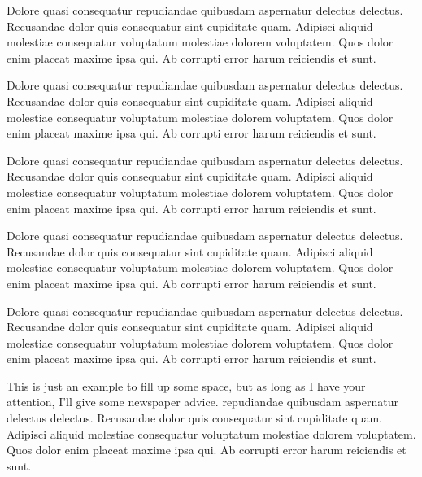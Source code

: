 \documentclass{article}
\date{\currenttime}
\begin{document}
\maketitle

\begin{multicols}{2}{


\Large

Dolore quasi consequatur repudiandae quibusdam aspernatur delectus delectus. Recusandae dolor quis consequatur sint cupiditate quam. Adipisci aliquid molestiae consequatur voluptatum molestiae dolorem voluptatem. Quos dolor enim placeat maxime ipsa qui. Ab corrupti error harum reiciendis et sunt.

Dolore quasi consequatur repudiandae quibusdam aspernatur delectus delectus. Recusandae dolor quis consequatur sint cupiditate quam. Adipisci aliquid molestiae consequatur voluptatum molestiae dolorem voluptatem. Quos dolor enim placeat maxime ipsa qui. Ab corrupti error harum reiciendis et sunt.

Dolore quasi consequatur repudiandae quibusdam aspernatur delectus delectus. Recusandae dolor quis consequatur sint cupiditate quam. Adipisci aliquid molestiae consequatur voluptatum molestiae dolorem voluptatem. Quos dolor enim placeat maxime ipsa qui. Ab corrupti error harum reiciendis et sunt.

Dolore quasi consequatur repudiandae quibusdam aspernatur delectus delectus. Recusandae dolor quis consequatur sint cupiditate quam. Adipisci aliquid molestiae consequatur voluptatum molestiae dolorem voluptatem. Quos dolor enim placeat maxime ipsa qui. Ab corrupti error harum reiciendis et sunt.

Dolore quasi consequatur repudiandae quibusdam aspernatur delectus delectus. Recusandae dolor quis consequatur sint cupiditate quam. Adipisci aliquid molestiae consequatur voluptatum molestiae dolorem voluptatem. Quos dolor enim placeat maxime ipsa qui. Ab corrupti error harum reiciendis et sunt.

\closearticle

This is just an example to fill up some space, but as long as I have your attention, I'll give some newspaper advice.
 repudiandae quibusdam aspernatur delectus delectus. Recusandae dolor quis consequatur sint cupiditate quam. Adipisci aliquid molestiae consequatur voluptatum molestiae dolorem voluptatem. Quos dolor enim placeat maxime ipsa qui. Ab corrupti error harum reiciendis et sunt.

}
\end{multicols}
\end{document}
